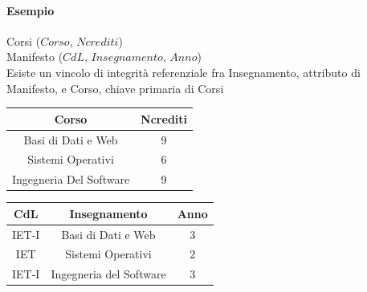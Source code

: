 \documentclass[../main.tex]{subfiles}
\begin{document}
	\paragraph{Esempio}
	Corsi ($Corso$, $Ncrediti$)\\
	Manifesto ($CdL$, $Insegnamento$, $Anno$)\\
	Esiste un vincolo di integrità referenziale fra Insegnamento, attributo di Manifesto, e Corso, chiave primaria di Corsi
	\begin{center}
		\begin{tabular}{ |c|c| }
			\hline
			\textbf{Corso} & \textbf{Ncrediti}\\
			\hline
			Basi di Dati e Web & 9\\
			Sistemi Operativi & 6\\
			Ingegneria Del Software & 9\\
			\hline
		\end{tabular}
		\hfill
		\begin{tabular}{ |c|c|c| }
			\hline
			\textbf{CdL} & \textbf{Insegnamento} & \textbf{Anno}\\
			\hline
			IET-I & Basi di Dati e Web & 3\\
			IET & Sistemi Operativi & 2\\
			IET-I & Ingegneria del Software & 3\\
			\hline
		\end{tabular}
	\end{center}
\end{document}
